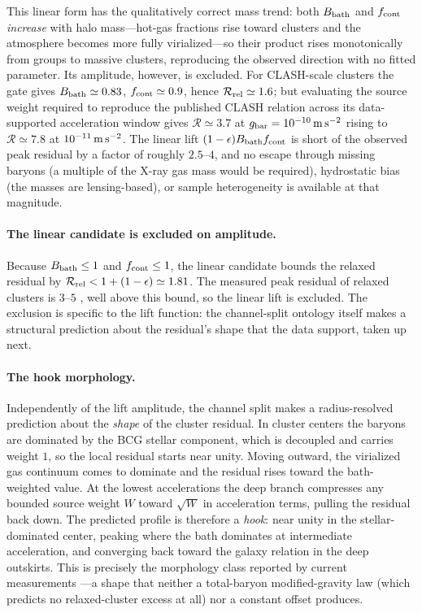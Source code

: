 \documentclass[11pt]{article}
\begin{document}
This linear form has the qualitatively correct mass trend: both $B_{\rm bath}$ and $f_{\rm cont}$ \emph{increase} with halo mass---hot-gas fractions rise toward clusters \citep{Vikhlinin2006,Sanderson2003} and the atmosphere becomes more fully virialized---so their product rises monotonically from groups to massive clusters, reproducing the observed direction with no fitted parameter. Its amplitude, however, is excluded. For CLASH-scale clusters the gate gives $B_{\rm bath}\simeq0.83$, $f_{\rm cont}\simeq0.9$, hence $\mathcal R_{\rm rel}\simeq1.6$; but evaluating the source weight required to reproduce the published CLASH relation \citep{Tian2020} across its data-supported acceleration window gives $\mathcal R\simeq3.7$ at $g_{\rm bar}=10^{-10}\,{\rm m\,s^{-2}}$ rising to $\mathcal R\simeq7.8$ at $10^{-11}\,{\rm m\,s^{-2}}$. The linear lift $(1-\epsilon)B_{\rm bath}f_{\rm cont}$ is short of the observed peak residual by a factor of roughly $2.5$--$4$, and no escape through missing baryons (a multiple of the X-ray gas mass would be required), hydrostatic bias (the masses are lensing-based), or sample heterogeneity is available at that magnitude.

\paragraph{The linear candidate is excluded on amplitude.}
Because $B_{\rm bath}\le1$ and $f_{\rm cont}\le1$, the linear candidate bounds the relaxed residual by $\mathcal R_{\rm rel}<1+(1-\epsilon)\simeq1.81$. The measured peak residual of relaxed clusters is $3$--$5$ \citep{Tian2020,Eckert2022}, well above this bound, so the linear lift is excluded. The exclusion is specific to the lift function: the channel-split ontology itself makes a structural prediction about the residual's shape that the data support, taken up next.

\paragraph{The hook morphology.}
Independently of the lift amplitude, the channel split makes a radius-resolved prediction about the \emph{shape} of the cluster residual. In cluster centers the baryons are dominated by the BCG stellar component, which is decoupled and carries weight $1$, so the local residual starts near unity. Moving outward, the virialized gas continuum comes to dominate and the residual rises toward the bath-weighted value. At the lowest accelerations the deep branch compresses any bounded source weight $W$ toward $\sqrt W$ in acceleration terms, pulling the residual back down. The predicted profile is therefore a \emph{hook}: near unity in the stellar-dominated center, peaking where the bath dominates at intermediate acceleration, and converging back toward the galaxy relation in the deep outskirts. This is precisely the morphology class reported by current measurements \citep{Eckert2022,Li2023}---a shape that neither a total-baryon modified-gravity law (which predicts no relaxed-cluster excess at all) nor a constant offset produces.
\end{document}
